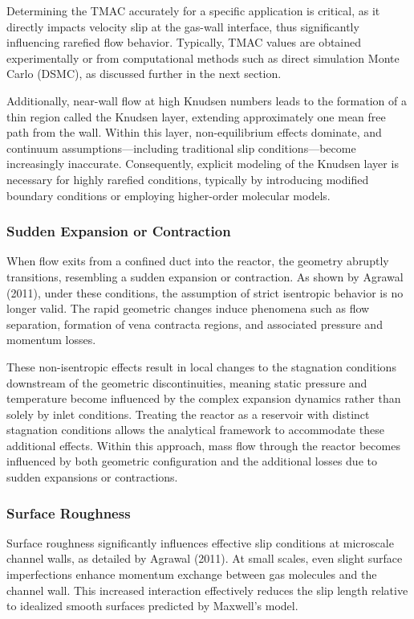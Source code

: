	Determining the TMAC accurately for a specific application is critical, as it directly impacts velocity slip at the gas-wall interface, thus significantly influencing rarefied flow behavior.
	Typically, TMAC values are obtained experimentally or from computational methods such as direct simulation Monte Carlo (DSMC), as discussed further in the next section.

	Additionally, near-wall flow at high Knudsen numbers leads to the formation of a thin region called the Knudsen layer, extending approximately one mean free path from the wall.
	Within this layer, non-equilibrium effects dominate, and continuum assumptions—including traditional slip conditions—become increasingly inaccurate.
	Consequently, explicit modeling of the Knudsen layer is necessary for highly rarefied conditions, typically by introducing modified boundary conditions or employing higher-order molecular models.

\subsubsection*{Sudden Expansion or Contraction}
	When flow exits from a confined duct into the reactor, the geometry abruptly transitions, resembling a sudden expansion or contraction.
	As shown by Agrawal (2011), under these conditions, the assumption of strict isentropic behavior is no longer valid.
	The rapid geometric changes induce phenomena such as flow separation, formation of vena contracta regions, and associated pressure and momentum losses.

	These non-isentropic effects result in local changes to the stagnation conditions downstream of the geometric discontinuities, meaning static pressure and temperature become influenced by the complex expansion dynamics rather than solely by inlet conditions.
	Treating the reactor as a reservoir with distinct stagnation conditions allows the analytical framework to accommodate these additional effects.
	Within this approach, mass flow through the reactor becomes influenced by both geometric configuration and the additional losses due to sudden expansions or contractions.

\subsubsection*{Surface Roughness}
	Surface roughness significantly influences effective slip conditions at microscale channel walls, as detailed by Agrawal (2011).
	At small scales, even slight surface imperfections enhance momentum exchange between gas molecules and the channel wall.
	This increased interaction effectively reduces the slip length relative to idealized smooth surfaces predicted by Maxwell's model.

